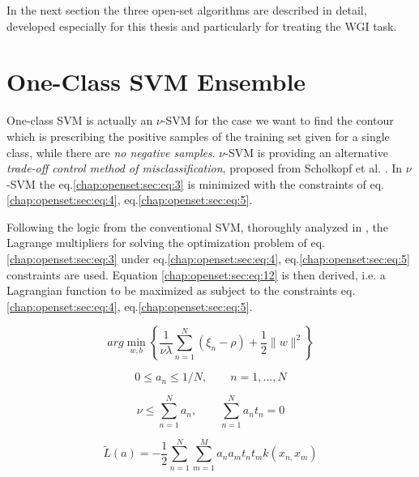 In the next section the three open-set algorithms are described in detail, developed especially for this thesis and particularly for treating the WGI task. 


\section{One-Class SVM Ensemble}\label{chap:openset:sec:OCSVM_description}

One-class SVM is actually an $\nu$-SVM for the case we want to find the contour which is prescribing the positive samples of the training set given for a single class, while there are \textit{no negative samples}. $\nu$-SVM is providing an alternative \textit{trade-off control method of misclassification}, proposed from Scholkopf et al. \parencite{scholkopf1999estimating}. In $\nu$-SVM the eq.\ref{chap:openset:sec:eq:3} is minimized with the constraints of eq.\ref{chap:openset:sec:eq:4}, eq.\ref{chap:openset:sec:eq:5}.

Following the logic from the conventional SVM, thoroughly analyzed in \parencite{bishop2006}, the Lagrange multipliers for solving the optimization problem of eq.\ref{chap:openset:sec:eq:3} under eq.\ref{chap:openset:sec:eq:4}, eq.\ref{chap:openset:sec:eq:5} constraints are used. Equation \ref{chap:openset:sec:eq:12} is then derived, i.e. a Lagrangian function to be maximized as subject to the constraints eq.\ref{chap:openset:sec:eq:4}, eq.\ref{chap:openset:sec:eq:5}.

\begin{equation}\label{chap:openset:sec:eq:3}
	arg\min_{w,b}\left\{ \frac{1}{\nu\lambda}\sum_{n=1}^{N}(\xi_{n}-\rho)+\frac{1}{2}\|w\|^{2}\right\}
\end{equation}

\begin{equation}\label{chap:openset:sec:eq:4}
	0\leqslant a_{n}\leqslant1/N,\qquad n=1,...,N
\end{equation}

\begin{equation}\label{chap:openset:sec:eq:5}
	\nu\leqslant\sum_{n=1}^{N}a_{n}, \qquad \sum_{n=1}^{N}a_{n}t_{n}=0
\end{equation}

\begin{equation}\label{chap:openset:sec:eq:12}
	\widetilde{L}(a)=-\frac{1}{2}\sum_{n=1}^{N}\sum_{m=1}^{M}a_{n}a_{m}t_{n}t_{m}k(x_{n,}x_{m})
\end{equation}

\newpage


